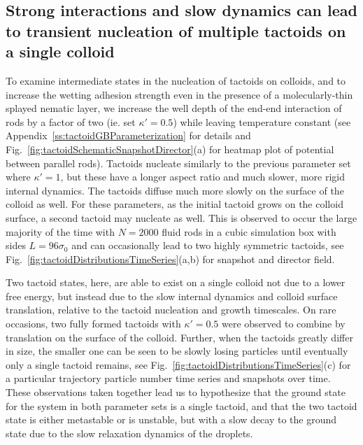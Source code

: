 \documentclass[%
 aip,
 amsmath,amssymb,
 reprint,%
]{revtex4-1}
\begin{document}
\subsection{Strong interactions and slow dynamics can lead to transient nucleation of multiple tactoids on a single colloid} \label{ss:tactoidMDSlowSplitting}
To examine intermediate states in the nucleation of tactoids on colloids, and to increase the wetting adhesion strength even in the presence of a molecularly-thin splayed nematic layer, we increase the well depth of the end-end interaction of rods by a factor of two (ie. set $\kappa'=0.5$) while leaving temperature constant (see Appendix~\ref{ss:tactoidGBParameterization} for details and  Fig.~\ref{fig:tactoidSchematicSnapshotDirector}(a) for heatmap plot of potential between parallel rods). Tactoids nucleate similarly to the previous parameter set where $\kappa'=1$, but these have a longer aspect ratio and much slower, more rigid internal dynamics. The tactoids diffuse much more slowly on the surface of the colloid as well. For these parameters, as the initial tactoid grows on the colloid surface, a second tactoid may nucleate as well. This is observed to occur the large majority of the time with $N=2000$ fluid rods in a cubic simulation box with sides $L=96\sigma_0$ and can occasionally lead to two highly symmetric tactoids, see Fig.~\ref{fig:tactoidDistributionsTimeSeries}(a,b) for snapshot and director field. 

Two tactoid states, here, are able to exist on a single colloid not due to a lower free energy, but instead due to the slow internal dynamics and colloid surface translation, relative to the tactoid nucleation and growth timescales. On rare occasions, two fully formed tactoids with $\kappa'=0.5$ were observed to combine by translation on the surface of the colloid. Further, when the tactoids greatly differ in size, the smaller one can be seen to be slowly losing particles until eventually only a single tactoid remains, see Fig.~\ref{fig:tactoidDistributionsTimeSeries}(c) for a particular trajectory particle number time series and snapshots over time. These observations taken together lead us to hypothesize that the ground state for the system in both parameter sets is a single tactoid, and that the two tactoid state is either metastable or is unstable, but with a slow decay to the ground state due to the slow relaxation dynamics of the droplets. 
\end{document}
